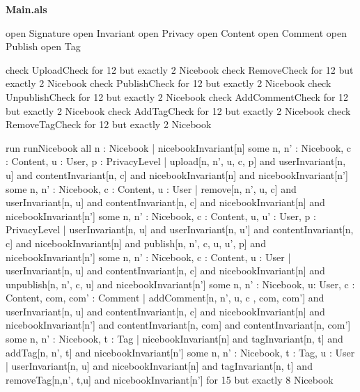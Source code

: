 \documentclass[titlepage]{article}
\begin{document}
{\bf\large Main.als}
\begin{alloy}
open Signature
open Invariant
open Privacy
open Content
open Comment
open Publish
open Tag

check UploadCheck for 12 but exactly 2 Nicebook
check RemoveCheck for 12 but exactly 2 Nicebook
check PublishCheck for 12 but exactly 2 Nicebook
check UnpublishCheck for 12 but exactly 2 Nicebook
check AddCommentCheck for 12 but exactly 2 Nicebook
check AddTagCheck for 12 but exactly 2 Nicebook
check RemoveTagCheck for 12 but exactly 2 Nicebook

run runNicebook {
    all n : Nicebook | nicebookInvariant[n]
    some n, n' : Nicebook, c : Content, u : User, p : PrivacyLevel | 
        upload[n, n', u, c, p] and userInvariant[n, u] and contentInvariant[n, c] and 
        nicebookInvariant[n] and nicebookInvariant[n']
    some n, n' : Nicebook, c : Content, u : User | remove[n, n', u, c] and 
        userInvariant[n, u] and contentInvariant[n, c] and 
        nicebookInvariant[n] and nicebookInvariant[n']
    some n, n' : Nicebook, c : Content, u, u' : User, p : PrivacyLevel | 
        userInvariant[n, u] and userInvariant[n, u'] and 
            contentInvariant[n, c] and nicebookInvariant[n] and 
            publish[n, n', c, u, u', p] and nicebookInvariant[n']
    some n, n' : Nicebook, c : Content, u : User | 
        userInvariant[n, u] and contentInvariant[n, c] and nicebookInvariant[n] 
            and unpublish[n, n', c, u] and nicebookInvariant[n']
    some n, n' : Nicebook, u: User, c : Content, com, com' : Comment | 
        addComment[n, n', u, c , com, com'] and userInvariant[n, u] and 
        contentInvariant[n, c] and nicebookInvariant[n] and nicebookInvariant[n'] and
            contentInvariant[n, com] and contentInvariant[n, com']
    some n, n' : Nicebook, t : Tag | 
        nicebookInvariant[n] and tagInvariant[n, t] and 
            addTag[n, n', t] and nicebookInvariant[n']
    some n, n' : Nicebook, t : Tag, u : User | 
        userInvariant[n, u] and nicebookInvariant[n] and tagInvariant[n, t]
            and removeTag[n,n', t,u] and nicebookInvariant[n']
} for 15 but exactly 8 Nicebook
\end{alloy}
\end{document}
